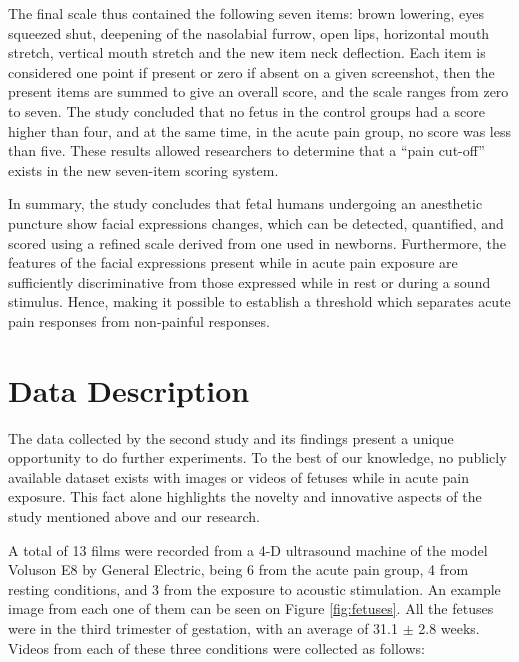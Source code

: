 The final scale thus contained the following seven items: brown lowering, eyes squeezed shut, deepening of the nasolabial furrow, open lips, horizontal mouth stretch, vertical mouth stretch and the new item neck deflection. Each item is considered one point if present or zero if absent on a given screenshot, then the present items are summed to give an overall score, and the scale ranges from zero to seven. The study concluded that no fetus in the control groups had a score higher than four, and at the same time, in the acute pain group, no score was less than five. These results allowed researchers to determine that a ``pain cut-off'' exists in the new seven-item scoring system.

In summary, the study concludes that fetal humans undergoing an anesthetic puncture show facial expressions changes, which can be detected, quantified, and scored using a refined scale derived from one used in newborns. Furthermore, the features of the facial expressions present while in acute pain exposure are sufficiently discriminative from those expressed while in rest or during a sound stimulus. Hence, making it possible to establish a threshold which separates acute pain responses from non-painful responses.

\section{Data Description}

The data collected by the second study and its findings present a unique opportunity to do further experiments. To the best of our knowledge, no publicly available dataset exists with images or videos of fetuses while in acute pain exposure. This fact alone highlights the novelty and innovative aspects of the study mentioned above and our research.

A total of 13 films were recorded from a 4-D ultrasound machine of the model Voluson E8 by General Electric, being 6 from the acute pain group, 4 from resting conditions, and 3 from the exposure to acoustic stimulation. An example image from each one of them can be seen on Figure \ref{fig:fetuses}. All the fetuses were in the third trimester of gestation, with an average of 31.1 $\pm$ 2.8 weeks.  Videos from each of these three conditions were collected as follows:

